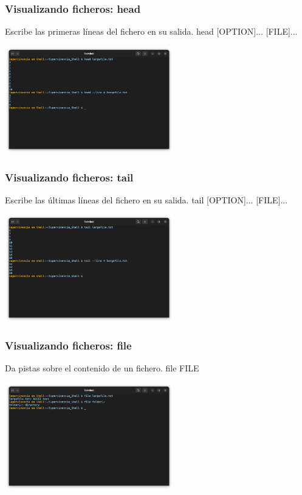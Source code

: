\documentclass[10pt]{beamer}
\begin{document}
	\begin{frame}
		\frametitle{Visualizando ficheros: head}
		\begin{alertblock}{Escribe las primeras líneas del fichero en su salida.}
			head [OPTION]... [FILE]...
		\end{alertblock}
		\begin{center}
			\includegraphics[width=0.55\textwidth]{head}
		\end{center}
	\end{frame}	
	
	\begin{frame}
		\frametitle{Visualizando ficheros: tail}
		\begin{alertblock}{Escribe las últimas líneas del fichero en su salida.}
			tail [OPTION]... [FILE]...
		\end{alertblock}
		\begin{center}
			\includegraphics[width=0.55\textwidth]{tail}
		\end{center}
	\end{frame}
		
	\begin{frame}
		\frametitle{Visualizando ficheros: file}
		\begin{alertblock}{Da pistas sobre el contenido de un fichero.}
			file FILE
		\end{alertblock}
		\begin{center}
			\includegraphics[width=0.55\textwidth]{file}
		\end{center}
	\end{frame}
		
\end{document}
